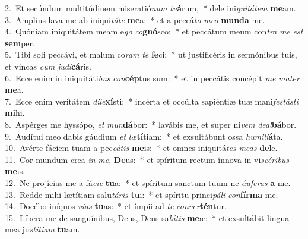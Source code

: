 {2.~}Et secúndum multitúdinem miseratió\textit{num} \textit{tu}\textbf{á}rum,~* dele ini\textit{qui}\textit{tá}\textit{tem} \textbf{me}am.\\
{3.~}Amplius lava me ab iniqui\textit{tá}\textit{te} \textbf{me}a:~* et a peccá\textit{to} \textit{me}\textit{o} \textbf{mun}\textbf{da} me.\\
{4.~}Quóniam iniquitátem meam e\textit{go} \textit{co}\textbf{gnó}sco:~* et peccátum meum con\textit{tra} \textit{me} \textit{est} \textbf{sem}per.\\
{5.~}Tibi soli peccávi, et malum co\textit{ram} \textit{te} \textbf{fe}ci:~* ut justificéris in sermónibus tuis, et vincas \textit{cum} \textit{ju}\textit{di}\textbf{cá}ris.\\
{6.~}Ecce enim in iniquitáti\textit{bus} \textit{con}\textbf{cép}tus sum:~* et in peccátis concépit \textit{me} \textit{ma}\textit{ter} \textbf{me}a.\\
{7.~}Ecce enim veritátem \textit{di}\textit{le}\textbf{xí}sti:~* incérta et occúlta sapiéntiæ tuæ mani\textit{fe}\textit{stá}\textit{sti} \textbf{mi}hi.\\
{8.~}Aspérges me hyssópo, \textit{et} \textit{mun}\textbf{dá}bor:~* lavábis me, et super ni\textit{vem} \textit{de}\textit{al}\textbf{bá}bor.\\
{9.~}Audítui meo dabis gáudium \textit{et} \textit{læ}\textbf{tí}tiam:~* et exsultábunt ossa \textit{hu}\textit{mi}\textit{li}\textbf{á}ta.\\
{10.~}Avérte fáciem tuam a pec\textit{cá}\textit{tis} \textbf{me}is:~* et omnes iniquitá\textit{tes} \textit{me}\textit{as} \textbf{de}le.\\
{11.~}Cor mundum crea \textit{in} \textit{me}, \textbf{De}us:~* et spíritum rectum ínnova in vi\textit{scé}\textit{ri}\textit{bus} \textbf{me}is.\\
{12.~}Ne projícias me a fá\textit{ci}\textit{e} \textbf{tu}a:~* et spíritum sanctum tuum ne \textit{áu}\textit{fe}\textit{ras} \textbf{a} me.\\
{13.~}Redde mihi lætítiam salu\textit{tá}\textit{ris} \textbf{tu}i:~* et spíritu princi\textit{pá}\textit{li} \textit{con}\textbf{fír}\textbf{ma} me.\\
{14.~}Docébo iníquos \textit{vi}\textit{as} \textbf{tu}as:~* et ímpii ad \textit{te} \textit{con}\textit{ver}\textbf{tén}tur.\\
{15.~}Líbera me de sanguínibus, Deus, Deus sa\textit{lú}\textit{tis} \textbf{me}æ:~* et exsultábit lingua mea ju\textit{stí}\textit{ti}\textit{am} \textbf{tu}am.\\
